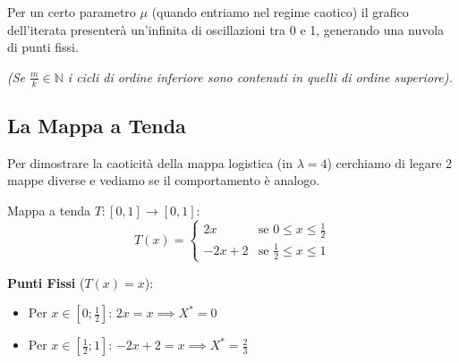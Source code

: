 \documentclass[openany]{book}
\theoremstyle{definition}
\theoremstyle{remark}
\begin{document}
\vspace{1.5em}
Per un certo parametro $\mu$ (quando entriamo nel regime caotico) il grafico dell'iterata presenterà un'infinita di oscillazioni tra 0 e 1, generando una nuvola di punti fissi.

\textit{(Se $\frac{m}{k} \in \mathbb{N}$ i cicli di ordine inferiore sono contenuti in quelli di ordine superiore).}

\subsection{La Mappa a Tenda}

Per dimostrare la caoticità della mappa logistica (in $\lambda = 4$) cerchiamo di legare 2 mappe diverse e vediamo se il comportamento è analogo.

Mappa a tenda $T: [0, 1] \to [0, 1]$:
$$ T(x) = \begin{cases} 
2x & \text{se } 0 \leq x \leq \frac{1}{2} \\ 
-2x + 2 & \text{se } \frac{1}{2} \leq x \leq 1 
\end{cases} $$

\begin{minipage}{0.55\textwidth}
    \textbf{Punti Fissi} ($T(x) = x$):
    \begin{itemize}
        \item Per $x \in \left[0; \frac{1}{2}\right]$: \quad $2x = x \implies X^* = 0$
        \item Per $x \in \left[\frac{1}{2}; 1\right]$: \quad $-2x + 2 = x \implies X^* = \frac{2}{3}$
    \end{itemize}
\end{minipage}
\begin{minipage}{0.4\textwidth}
    \begin{center}
    \end{center}
\end{minipage}
\end{document}
